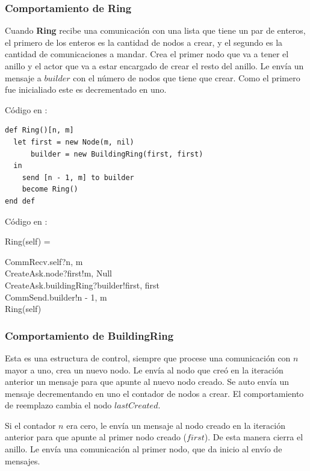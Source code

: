 \subsubsection*{Comportamiento de Ring}

Cuando \textbf{Ring} recibe una comunicación con una lista que tiene un par de enteros, el primero de los enteros es la cantidad de nodos a crear, y el segundo es la cantidad de comunicaciones a mandar. Crea el primer nodo que va a tener el anillo y el actor que va a estar encargado de crear el resto del anillo. Le envía un mensaje a $builder$ con el número de nodos que tiene que crear. Como el primero fue inicialiado este es decrementado en uno.

Código en \SAL:

\begin{lstlisting}[language=sal, style=simple]
def Ring()[n, m]
  let first = new Node(m, nil)
      builder = new BuildingRing(first, first) 
  in
    send [n - 1, m] to builder
    become Ring() 
end def
\end{lstlisting}

Código en \CSP:

\begin{process}
Ring(self) = \\ \quad
  \begin{block}
  CommRecv.self?\langle n, m \rangle \then \\
  CreateAsk.node?first!\langle m, Null \rangle \then \\
  CreateAsk.buildingRing?builder!\langle first, first \rangle \then \\
  CommSend.builder!\langle n - 1, m\rangle \then \\
  Ring(self)
  \end{block}
\end{process}

\subsubsection*{Comportamiento de BuildingRing}

Esta es una estructura de control, siempre que procese una comunicación con $n$ mayor a uno, crea un nuevo nodo. Le envía al nodo que creó en la iteración anterior un mensaje para que apunte al nuevo nodo creado. Se auto envía un mensaje decrementando en uno el contador de nodos a crear. El comportamiento de reemplazo cambia el nodo $lastCreated$.

Si el contador $n$ era cero, le envía un mensaje al nodo creado en la iteración anterior para que apunte al primer nodo creado ($first$). De esta manera cierra el anillo. Le envía una comunicación al primer nodo, que da inicio al envío de mensajes. 

